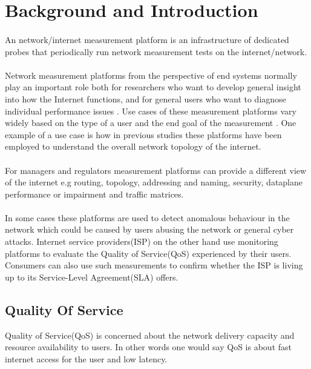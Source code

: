 \section{Background and Introduction}
\paragraph{}
An network/internet measurement platform is an infrastructure of dedicated probes that periodically run network measurement tests on the internet/network\cite{7076582}.

\paragraph{}
 Network measurement platforms from the perspective of end systems normally play an important role both for researchers who want to develop general insight into how the Internet functions, and for general users who want to diagnose individual performance issues \cite{Dhawan:2012:FBN:2398776.2398786}. Use cases of these measurement platforms vary widely based on the type of a user and the end goal of the measurement \cite{Ford:2018:RWR:3243157.3243167}. One example of a use case is how in  previous studies these platforms have been employed to understand the overall network topology of the internet\cite{7076582}.
\paragraph{}
For managers and regulators measurement platforms can provide a different view of the internet e.g routing, topology, addressing and naming, security, dataplane performance or impairment and traffic matrices\cite{Ford:2018:RWR:3243157.3243167}.
\paragraph{}
In some cases these platforms are used to detect anomalous behaviour in the network which could be caused by users abusing the network or general cyber attacks. Internet service providers(ISP) on the other hand use monitoring platforms to evaluate the Quality of Service(QoS) experienced by their users\cite{7076582}. Consumers can also use such measurements to confirm whether the ISP is living up to its Service-Level Agreement(SLA) offers.

\subsection{Quality Of Service}
Quality of Service(QoS) is concerned about the network
delivery capacity and resource availability to users. In
other words one would say QoS is about fast internet
access for the user and low latency. 
